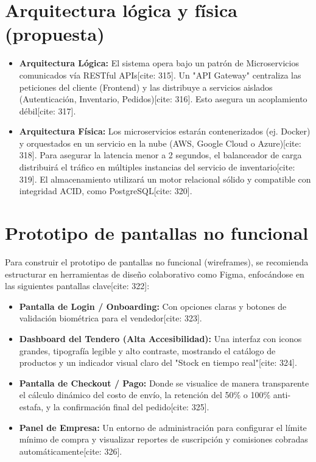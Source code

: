\documentclass[11pt,a4paper]{report}
\begin{document}
\section{Arquitectura lógica y física (propuesta)} %
\begin{itemize}[leftmargin=*]
    \item \textbf{Arquitectura Lógica:} El sistema opera bajo un patrón de Microservicios comunicados vía RESTful APIs[cite: 315]. Un "API Gateway" centraliza las peticiones del cliente (Frontend) y las distribuye a servicios aislados (Autenticación, Inventario, Pedidos)[cite: 316]. Esto asegura un acoplamiento débil[cite: 317].
    \item \textbf{Arquitectura Física:} Los microservicios estarán contenerizados (ej. Docker) y orquestados en un servicio en la nube (AWS, Google Cloud o Azure)[cite: 318]. Para asegurar la latencia menor a 2 segundos, el balanceador de carga distribuirá el tráfico en múltiples instancias del servicio de inventario[cite: 319]. El almacenamiento utilizará un motor relacional sólido y compatible con integridad ACID, como PostgreSQL[cite: 320].
\end{itemize}

\section{Prototipo de pantallas no funcional} %
Para construir el prototipo de pantallas no funcional (wireframes), se recomienda estructurar en herramientas de diseño colaborativo como Figma, enfocándose en las siguientes pantallas clave[cite: 322]:
\begin{itemize}[leftmargin=*]
    \item \textbf{Pantalla de Login / Onboarding:} Con opciones claras y botones de validación biométrica para el vendedor[cite: 323].
    \item \textbf{Dashboard del Tendero (Alta Accesibilidad):} Una interfaz con iconos grandes, tipografía legible y alto contraste, mostrando el catálogo de productos y un indicador visual claro del "Stock en tiempo real"[cite: 324].
    \item \textbf{Pantalla de Checkout / Pago:} Donde se visualice de manera transparente el cálculo dinámico del costo de envío, la retención del 50\% o 100\% anti-estafa, y la confirmación final del pedido[cite: 325].
    \item \textbf{Panel de Empresa:} Un entorno de administración para configurar el límite mínimo de compra y visualizar reportes de suscripción y comisiones cobradas automáticamente[cite: 326].
\end{itemize}
\end{document}
